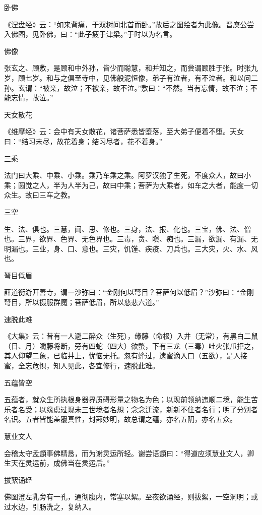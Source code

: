 \documentclass[a4paper,12pt,UTF8,twoside]{ctexbook}
\begin{document}
    卧佛
    
    《涅盘经》云：“如来背痛，于双树间北首而卧。”故后之图绘者为此像。晋庾公尝入佛图，见卧佛，曰：“此子疲于津梁。”于时以为名言。
    
    佛像
    
    张玄之、顾敷，是顾和中外孙，皆少而聪慧，和并知之，而尝谓顾胜于张。时张九岁，顾七岁。和与之俱至寺中，见佛般泥恒像，弟子有泣者，有不泣者。和以问二孙。玄谓：“被亲，故泣；不被亲，故不泣。”敷曰：“不然。当有忘情，故不泣；不能忘情，故泣。”
    
    天女散花
    
    《维摩经》云：会中有天女散花，诸菩萨悉皆堕落，至大弟子便着不堕。天女曰：“结习未尽，故花着身；结习尽者，花不着身。”
    
    三乘
    
    法门曰大乘、中乘、小乘。乘乃车乘之乘。阿罗汉独了生死，不度众人，故曰小乘；圆觉之人，半为人半为己，故曰中乘；菩萨为大乘者，如车之大者，能度一切众生。故曰三车之教。
    
    三空
    
    生、法、俱也。三慧，闻、思、修也。三身，法、报、化也。三宝，佛、法、僧也。三界，欲界、色界、无色界也。三毒，贪、瞋、痴也。三漏，欲漏、有漏、无明漏也。三业，身、口、意也。三灾，饥馑、疾疫、刀兵也。三大灾，火、水、风也。
    
    弩目低眉
    
    薛道衡游开善寺，谓一沙弥曰：“金刚何以弩目？菩萨何以低眉？”沙弥曰：“金刚弩目，所以摄服群魔；菩萨低眉，所以慈悲六道。”
    
    速脱此难
    
    《大集》云：昔有一人避二醉众（生死），缘藤（命根）入井（无常），有黑白二鼠（日、月）嚼藤将断，旁有四蛇（四大）欲螫，下有三龙（三毒）吐火张爪拒之，其人仰望二象，已临井上，忧恼无托。忽有蜂过，遗蜜滴入口（五欲），是人接蜜，全忘危惧，知人见此，各宜修行，速脱此难。
    
    五蕴皆空
    
    五蕴者，就众生所执根身器界质碍形量之物名为色；以现前领纳违顺二境，能生苦乐者名受；以缘虑过现未三世境者名想；念念迁流，新新不住者名行；明了分别者名识。五者皆能盖覆真性，封蔀妙明，故总谓之蕴，亦名五阴，亦名五众。
    
    慧业文人
    
    会稽太守孟顗事佛精恳，而为谢灵运所轻。谢尝语顗曰：“得道应须慧业文人，卿生天在灵运前，成佛当在灵运后。”
    
    拔絮诵经
    
    佛图澄左乳旁有一孔，通彻腹内，常塞以絮。至夜欲诵经，则拔絮，一空洞明；或过水边，引肠洗之，复纳入。
    
\end{document}
